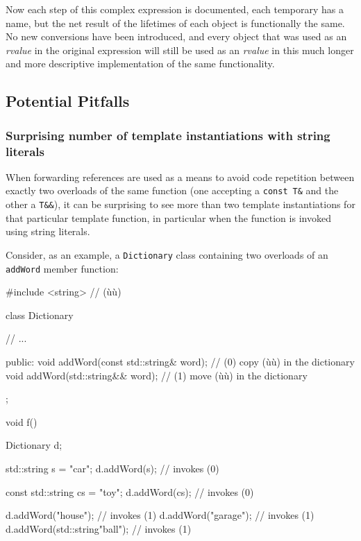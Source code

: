 \noindent Now each step of this complex expression is documented, each temporary
has a name, but the net result of the lifetimes of each object is
functionally the same. No new conversions have been introduced, and
every object that was used as an \emph{rvalue} in the original
expression will still be used as an \emph{rvalue} in this much longer
and more descriptive implementation of the same functionality.

\subsection[Potential Pitfalls]{Potential Pitfalls}\label{potential-pitfalls}

\subsubsection[Surprising number of template instantiations with string literals]{Surprising number of template instantiations with string literals}\label{surprising-number-of-template-instantiations-with-string-literals}

When forwarding references are used as a means to avoid code repetition
between exactly two overloads of the same function (one accepting a
\texttt{const}~\texttt{T\&} and the other a \texttt{T\&\&}), it can be
surprising to see more than two template instantiations for that
particular template function, in particular when the function is invoked
using string literals.

Consider, as an example, a \texttt{Dictionary} class containing two
overloads of an \texttt{addWord} member function:
\begin{emcppshiddenlisting}[emcppsbatch={e15,e16}]
#include <string>  // (ù{}ù)
\end{emcppshiddenlisting}
\begin{emcppslisting}[emcppsbatch=e15]
class Dictionary
{
    // ...

public:
    void addWord(const std::string& word);  // (0) copy (ù{}ù) in the dictionary
    void addWord(std::string&& word);       // (1) move (ù{}ù) in the dictionary
};

void f()
{
    Dictionary d;

    std::string s = "car";
    d.addWord(s);                    // invokes (0)

    const std::string cs = "toy";
    d.addWord(cs);                   // invokes (0)

    d.addWord("house");              // invokes (1)
    d.addWord("garage");             // invokes (1)
    d.addWord(std::string{"ball"});  // invokes (1)
}
\end{emcppslisting}

